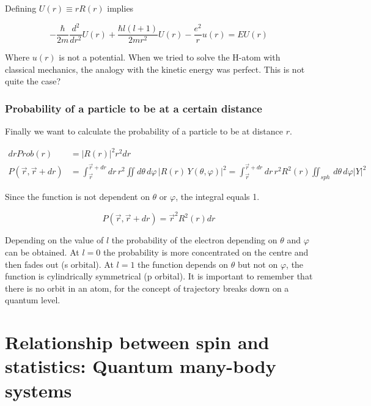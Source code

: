 		Defining $U(r) \equiv rR(r)$ implies

		$$-\frac{\hbar}{2m} \frac{d^2}{dr^2} U(r) + \frac{\hbar l(l+1)}{2mr^2} U(r) - \frac{e^2}{r} u(r) = E U(r)$$

		Where $u(r)$ is not a potential.
		When we tried to solve the H-atom with classical mechanics, the analogy with the kinetic energy was perfect.
		This is not quite the case?

		\subsubsection{Probability of a particle to be at a certain distance}
		Finally we want to calculate the probability of a particle to be at distance $r$.

		\begin{align*}
			drProb(r)&=|R(r)|^2r^2dr\\
			P(\vec{r},\vec{r}+dr)&=\int_{\vec{r}}^{\vec{r}+dr}dr\,r^2\iint d\theta\,d\varphi\,|R(r)\,Y(\theta,\varphi)|^2=\int_{\vec{r}}^{\vec{r}+dr}dr\,r^2R^2(r)\iint_{sph}\,d\theta\,d\varphi|Y|^2
		\end{align*}

		Since the function is not dependent on $\theta$ or $\varphi$, the integral equals 1.

		$$P(\vec{r},\vec{r}+dr)=\vec{r}^2R^2(r)dr$$

		Depending on the value of $l$ the probability of the electron depending on $\theta$ and $\varphi$ can be obtained.
		At $l=0$ the probability is more concentrated on the centre and then fades out (s orbital).
		At $l=1$ the function depends on $\theta$ but not on $\varphi$, the function is cylindrically symmetrical (p orbital).
		It is important to remember that there is no orbit in an atom, for the concept of trajectory breaks down on a quantum level.

\section{Relationship between spin and statistics: Quantum many-body systems}

